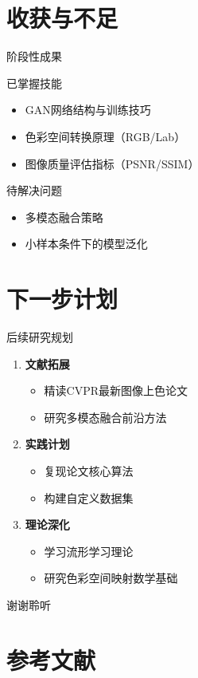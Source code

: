 \documentclass[aspectratio=169,AutoFakeBold]{beamer}
\begin{document}
\section{收获与不足}
\begin{frame}{阶段性成果}
    \begin{textbox}{已掌握技能}
        \begin{itemize}
            \item GAN网络结构与训练技巧
            \item 色彩空间转换原理（RGB/Lab）
            \item 图像质量评估指标（PSNR/SSIM）
        \end{itemize}
    \end{textbox}
    
    \begin{textbox}{待解决问题}
        \begin{itemize}
            \item 多模态融合策略
            \item 小样本条件下的模型泛化
        \end{itemize} 
    \end{textbox}
\end{frame}

\section{下一步计划}
\begin{frame}{后续研究规划}
    \begin{enumerate}
        \item \textbf{文献拓展}
            \begin{itemize}
                \item 精读CVPR最新图像上色论文
                \item 研究多模态融合前沿方法
            \end{itemize}
        \item \textbf{实践计划}
            \begin{itemize}
                \item 复现论文核心算法
                \item 构建自定义数据集
            \end{itemize}
        \item \textbf{理论深化}
            \begin{itemize}
                \item 学习流形学习理论
                \item 研究色彩空间映射数学基础
            \end{itemize}
    \end{enumerate}
\end{frame}

\begin{frame}
    \Background
    \begin{center}
        {\Huge\calligra 谢谢聆听}
    \end{center}
\end{frame}

\section{参考文献}
\end{document}
